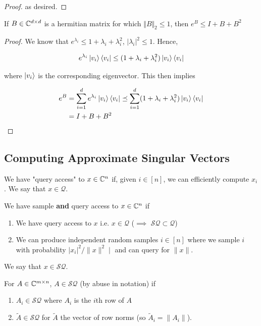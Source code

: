 \documentclass[main.tex]{subfiles}
\begin{document}
\begin{theorem}
\begin{proof}
as desired.
\end{proof}
\end{theorem}

\begin{lemma}
\label{lemma:exp-eigen-approx}
If $B \in \mathbb{C}^{d \times d}$ is a hermitian matrix for which $\Vert B \Vert_2 \leq 1$, then $e^{B} \leq I + B + B^2$

\begin{proof}
	We know that $e^{\lambda_i} \leq 1 + \lambda_i + \lambda_i^2$, $|\lambda_i|^2 \leq 1$. Hence,
	
	\begin{align*}
	e^{\lambda_i} \ket{v_i}\bra{v_i} \leq (1 + \lambda_i + \lambda_i^2) 	\ket{v_i}\bra{v_i}
	\end{align*}

	where $\ket{v_i}$ is the corresponding eigenvector. This then implies
	
	\begin{align*}
	e^B &= \sum_{i=1}^d e^{\lambda_i} \ket{v_i}\bra{v_i} \preceq \sum_{i=1}^d (1 + \lambda_i + \lambda_i^2) \ket{v_i}\bra{v_i} \\
	&= I + B + B^2
	\end{align*}
\end{proof}
\end{lemma}


\subsection{Computing Approximate Singular Vectors}
\label{sec:approx-sing-vec}

\begin{definition}
We have "query access" to $x \in \mathbb{C}^n$ if, given $i \in [n]$, we can efficiently compute $x_i$. We say that $x \in \mathcal{Q}$.
\end{definition}
\begin{definition} We have sample \textbf{and} query access to $x \in \mathbb{C}^n$ if 

\begin{enumerate}
\item We have query access to $x$ i.e. $x\in \mathcal{Q}$ ($\implies$ $\mathcal{SQ} \subset \mathcal{Q}$)
\item We can produce independent random samples $i \in [n]$ where we sample $i$ with probability $|x_i|^2/\|x\|^2∣$ and can query for $\|x\|$.
\end{enumerate}
We say that $x \in \mathcal{SQ}$. 
\end{definition}
\begin{definition} For $A \in \mathbb{C}^{m\times n}$, $A \in \mathcal{SQ}$ (by abuse in notation) if

\begin{enumerate}
\item $A_i \in \mathcal{SQ}$ where $A_i$ is the $i$th row of $A$
\item $\tilde{A} \in \mathcal{SQ}$ for $\tilde{A}$ the vector of row norms (so $\tilde{A}_i = \|A_i\|$).	
\end{enumerate}
\end{definition}
\end{document}
